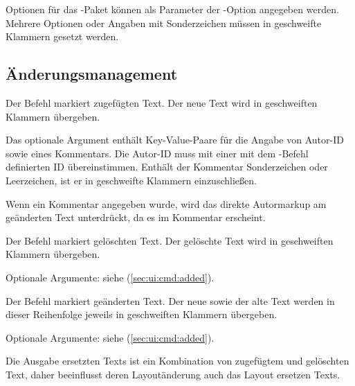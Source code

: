 
Optionen für das -Paket können als Parameter der -Option angegeben werden.
Mehrere Optionen oder Angaben mit Sonderzeichen müssen in geschweifte Klammern gesetzt werden.




\subsection{Änderungsmanagement}
\label{sec:ui:changemanagement}

\localtableofcontents



Der Befehl  markiert zugefügten Text.
Der neue Text wird in geschweiften Klammern übergeben.

Das optionale Argument enthält Key-Value-Paare für die Angabe von Autor-ID sowie eines Kommentars.
Die Autor-ID muss mit einer mit dem -Befehl definierten ID übereinstimmen.
Enthält der Kommentar Sonderzeichen oder Leerzeichen, ist er in geschweifte Klammern einzuschließen.

Wenn ein Kommentar angegeben wurde, wird das direkte Autormarkup am geänderten Text unterdrückt, da es im Kommentar erscheint.





Der Befehl  markiert gelöschten Text.
Der gelöschte Text wird in geschweiften Klammern übergeben.

Optionale Argumente: siehe  (\autoref{sec:ui:cmd:added}).





Der Befehl  markiert geänderten Text.
Der neue sowie der alte Text werden in dieser Reihenfolge jeweils in geschweiften Klammern übergeben.

Optionale Argumente: siehe  (\autoref{sec:ui:cmd:added}).

Die Ausgabe ersetzten Texts ist ein Kombination von zugefügtem und gelöschten Text, daher beeinflusst deren Layoutänderung auch das Layout ersetzen Texts.

